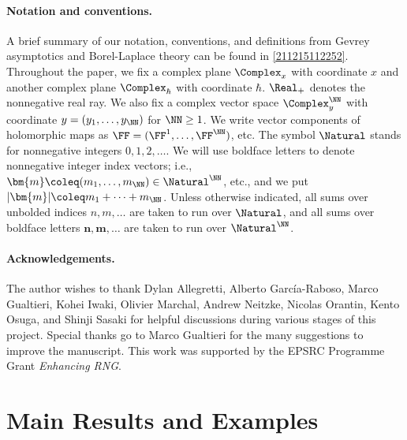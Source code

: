 \documentclass[11pt]{article}
\renewcommand{\mm}{{\bm{m}}}
\renewcommand{\nn}{{\bm{n}}}
\begin{document}
\vspace{-5pt}

\paragraph{Notation and conventions.}
\label{211214170249}
A brief summary of our notation, conventions, and definitions from Gevrey asymptotics and Borel-Laplace theory can be found in \autoref{211215112252}.
Throughout the paper, we fix a complex plane $\Complex_x$ with coordinate $x$ and another complex plane $\Complex_\hbar$ with coordinate $\hbar$.
$\Real_+$ denotes the nonnegative real ray.
We also fix a complex vector space $\Complex^\NN_y$ with coordinate $y = (y_1, \ldots, y_\NN)$ for $\NN \geq 1$.
We write vector components of holomorphic maps as $\FF = (\FF^1, \ldots, \FF^\NN)$, etc.
The symbol $\Natural$ stands for nonnegative integers $0, 1, 2, \ldots$.
We will use boldface letters to denote nonnegative integer index vectors; i.e., $\mm \coleq (m_1, \ldots, m_\NN) \in \Natural^\NN$, etc., and we put $|\mm| \coleq m_1 + \cdots + m_\NN$.
Unless otherwise indicated, all sums over unbolded indices $n, m, \ldots$ are taken to run over $\Natural$, and all sums over boldface letters $\nn, \mm, \ldots$ are taken to run over $\Natural^\NN$.

\enlargethispage{15pt}

\paragraph*{Acknowledgements.}
The author wishes to thank Dylan Allegretti, Alberto García-Raboso, Marco Gualtieri, Kohei Iwaki, Olivier Marchal, Andrew Neitzke, Nicolas Orantin, Kento Osuga, and Shinji Sasaki for helpful discussions during various stages of this project.
Special thanks go to Marco Gualtieri for the many suggestions to improve the manuscript.
This work was supported by the EPSRC Programme Grant \textit{Enhancing RNG}.



\newpage

\section{Main Results and Examples}
\label{220222154343}
\end{document}
